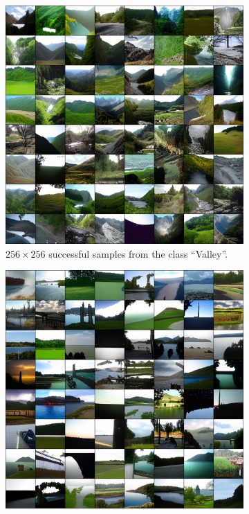 \begin{figure}[ht]
    \centering
    \begin{subfigure}[b]{0.47\textwidth}
        \centering
        \includegraphics[width=1.0\textwidth]{figures/imagenet-valley-small.png}
        \caption{
            $256 \times 256$ successful samples from the class ``Valley''.}
    \end{subfigure}
    \hfill
    \begin{subfigure}[b]{0.47\textwidth}
        \centering
        \includegraphics[width=1.0\textwidth]{figures/imagenet-lakeside-small.png}

\end{subfigure}
\end{figure}
